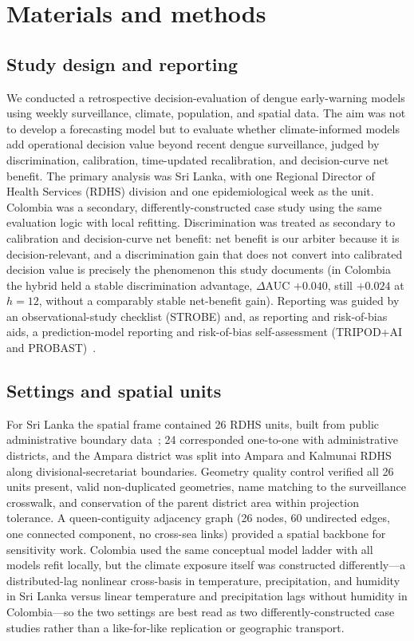 \documentclass[11pt,a4paper]{article}
\begin{document}
\section{Materials and methods}

\subsection{Study design and reporting}
We conducted a retrospective decision-evaluation of dengue early-warning models using weekly surveillance, climate, population, and spatial data. The aim was not to develop a forecasting model but to evaluate whether climate-informed models add operational decision value beyond recent dengue surveillance, judged by discrimination, calibration, time-updated recalibration, and decision-curve net benefit. The primary analysis was Sri Lanka, with one Regional Director of Health Services (RDHS) division and one epidemiological week as the unit. Colombia was a secondary, differently-constructed case study using the same evaluation logic with local refitting. Discrimination was treated as secondary to calibration and decision-curve net benefit: net benefit is our arbiter because it is decision-relevant, and a discrimination gain that does not convert into calibrated decision value is precisely the phenomenon this study documents (in Colombia the hybrid held a stable discrimination advantage, $\Delta$AUC $+0.040$, still $+0.024$ at $h=12$, without a comparably stable net-benefit gain). Reporting was guided by an observational-study checklist (STROBE) and, as reporting and risk-of-bias aids, a prediction-model reporting and risk-of-bias self-assessment (TRIPOD+AI and PROBAST)~\cite{vonElm2007,Collins2024TRIPODAI,Wolff2019,Moons2019}.

\subsection{Settings and spatial units}
For Sri Lanka the spatial frame contained 26 RDHS units, built from public administrative boundary data~\cite{HDXCODABSriLanka}; 24 corresponded one-to-one with administrative districts, and the Ampara district was split into Ampara and Kalmunai RDHS along divisional-secretariat boundaries. Geometry quality control verified all 26 units present, valid non-duplicated geometries, name matching to the surveillance crosswalk, and conservation of the parent district area within projection tolerance. A queen-contiguity adjacency graph (26 nodes, 60 undirected edges, one connected component, no cross-sea links) provided a spatial backbone for sensitivity work. Colombia used the same conceptual model ladder with all models refit locally, but the climate exposure itself was constructed differently---a distributed-lag nonlinear cross-basis in temperature, precipitation, and humidity in Sri Lanka versus linear temperature and precipitation lags without humidity in Colombia---so the two settings are best read as two differently-constructed case studies rather than a like-for-like replication or geographic transport.
\end{document}
